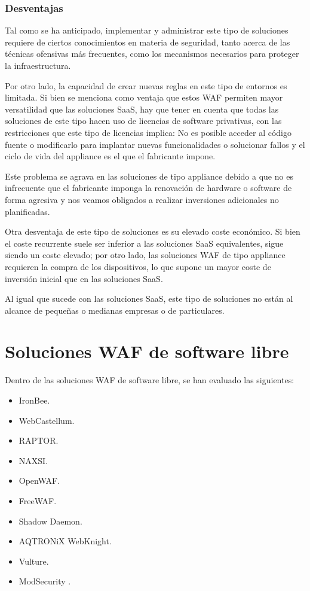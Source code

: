 \subsubsection{Desventajas}
\par Tal como se ha anticipado, implementar y administrar este tipo de soluciones requiere de ciertos conocimientos en materia de seguridad,
tanto acerca de las técnicas ofensivas más frecuentes, como los mecanismos necesarios para proteger la infraestructura.
\par Por otro lado, la capacidad de crear nuevas reglas en este tipo de entornos es limitada. Si bien se menciona como ventaja que estos WAF
permiten mayor versatilidad que las soluciones SaaS, hay que tener en cuenta que todas las soluciones de este tipo hacen uso de licencias de
software privativas, con las restricciones que este tipo de licencias implica:  No es posible acceder al código fuente o modificarlo para
implantar nuevas funcionalidades o solucionar fallos y el ciclo de vida del appliance es el que el fabricante impone.
\par Este problema se agrava en las soluciones de tipo appliance debido a que no es infrecuente que el fabricante imponga la renovación de
hardware o software de forma agresiva y nos veamos obligados a realizar inversiones adicionales no planificadas.

\par Otra desventaja de este tipo de soluciones es su elevado coste económico. Si bien el coste recurrente suele ser inferior a las soluciones
SaaS equivalentes, sigue siendo un coste elevado; por otro lado, las soluciones WAF de tipo appliance requieren la compra de los dispositivos,
lo que supone un mayor coste de inversión inicial que en las soluciones SaaS.
\par Al igual que sucede con las soluciones SaaS, este tipo de soluciones no están al alcance de pequeñas o medianas empresas o de
particulares.

\section{Soluciones WAF de software libre}
\par Dentro de las soluciones WAF de software libre, se han evaluado las siguientes:
\begin{itemize}
  \item IronBee\cite{IronBee}.
  \item WebCastellum\cite{WebCastellum}.
  \item RAPTOR\cite{raptor}.
  \item NAXSI\cite{NAXSI}.
  \item OpenWAF\cite{openwaf}.
  \item FreeWAF\cite{freewaf}.
  \item Shadow Daemon\cite{ShadowDaemon}.
  \item AQTRONiX WebKnight\cite{WebKnight}.
  \item Vulture\cite{vulture}.
  \item ModSecurity \cite{modsecurity}.
\end{itemize}

